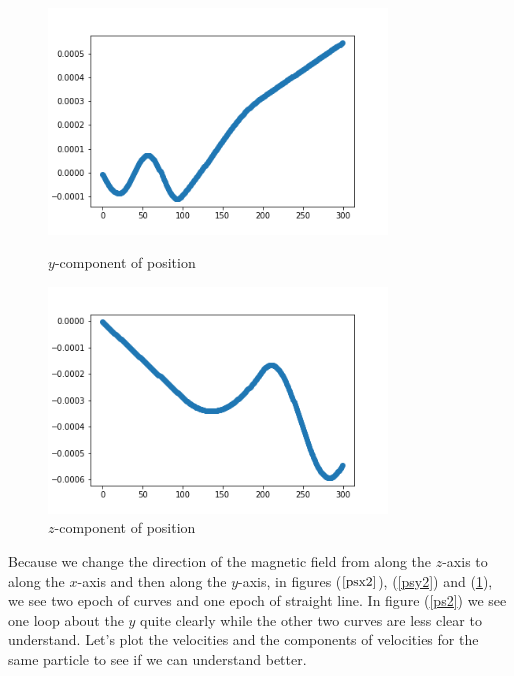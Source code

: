 \documentclass[12pt]{article}
\begin{document}
	\begin{figure}[H]
		\begin{multicols}{2}
			\includegraphics[width=\linewidth, height=6cm]{psy2.png} \caption{$y$-component of position} \label{psy2} \par
			\includegraphics[width=\linewidth, height=6cm]{psz2.png} \caption{$z$-component of position} \label{psz2} \par
		\end{multicols}
	\end{figure}
	\noindent Because we change the direction of the magnetic field from along the $z$-axis to along the $x$-axis and then along the $y$-axis, in figures ($\ref{psx2}$), (\ref{psy2}) and (\ref{psz2}), we see two epoch of curves and one epoch of straight line. In figure (\ref{ps2}) we see one loop about the $y$ quite clearly while the other two curves are less clear to understand. Let's plot the velocities and the components of velocities for the same particle to see if we can understand better.
\end{document}
